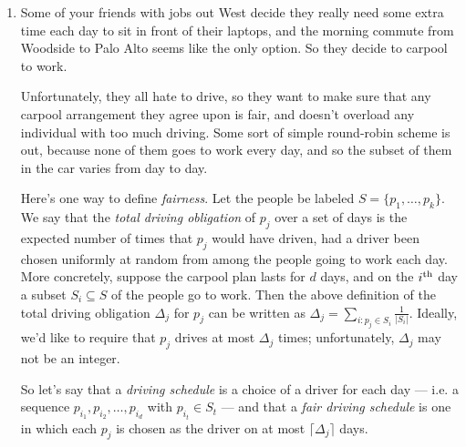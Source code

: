 \documentclass[12pt]{article}
\newcommand{\cel}[1]{
{\lceil {#1} \rceil}
}
\begin{document}
\begin{enumerate}
{}


\item 

Some of your friends with jobs out West
decide they really need some extra time
each day to sit in front of their laptops,
and the morning commute from Woodside to
Palo Alto seems like the only option.
So they decide to carpool to work.

Unfortunately, they all hate to drive,
so they want to make sure that any
carpool arrangement they agree upon is fair,
and doesn't overload any individual with too much driving.
Some sort of simple round-robin scheme is out,
because none of them goes to work every day,
and so the subset of them in the car
varies from day to day.

Here's one way to define {\em fairness}.
Let the people be labeled $S = \{p_1, \ldots, p_k\}$.
We say that the {\em total driving obligation}
of $p_j$ over a set of days
is the expected number of times that
$p_j$ would have driven, had a driver been
chosen uniformly at random from among
the people going to work each day.
More concretely,
suppose the carpool plan lasts for $d$ days, and on the
$i^{\rm th}$ day a subset $S_i \subseteq S$ of the
people go to work.
Then the above definition of the total
driving obligation $\Delta_j$ for $p_j$ can be written as
$\Delta_j = \sum_{i: p_j \in S_i} \frac{1}{|S_i|}$.
Ideally, we'd like to require that
$p_j$ drives at most $\Delta_j$ times;
unfortunately, $\Delta_j$ may not be an integer.

So let's say that a {\em driving schedule} is
a choice of a driver for each day ---
i.e. a sequence $p_{i_1}, p_{i_2}, \ldots, p_{i_d}$
with $p_{i_t} \in S_t$ ---
and that a {\em fair driving schedule}
is one in which each $p_j$ is chosen as
the driver on at most $\cel{\Delta_j}$ days.


\end{enumerate}
\end{document}
